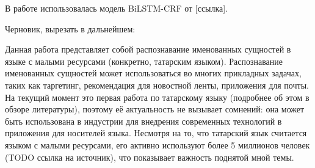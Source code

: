 В работе использовалась модель BiLSTM-CRF от [ссылка].


Черновик, вырезать в дальнейшем:


Данная работа представляет собой распознавание именованных сущностей в языке с малыми ресурсами (конкретно, татарским языком). 
Распознавание именованных сущностей может использоваться во многих прикладных задачах, таких как таргетинг, рекомендация для
новостной ленты, приложения для почты. На текущий момент это первая работа по татарскому языку (подробнее об этом в обзоре 
литературы), поэтому её актуальность не вызывает сомнений: она может быть использована в индустрии для внедрения современных
технологий в приложения для носителей языка. Несмотря на то, что татарский язык считается языком с малыми ресурсами, его 
активно используют более 5 миллионов человек (TODO ссылка на источник), что показывает важность поднятой мной темы.

